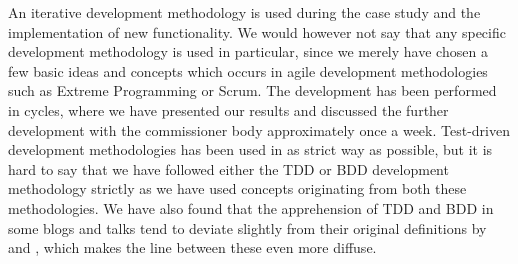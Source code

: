 
An iterative development methodology is used during the case study and
the implementation of new functionality. We would however not say that
any specific development methodology is used in particular, since we
merely have chosen a few basic ideas and concepts which occurs in agile
development methodologies such as Extreme Programming or Scrum. The
development has been performed in cycles, where we have presented our
results and discussed the further development with the commissioner body
approximately once a week. Test-driven development methodologies has
been used in as strict way as possible, but it is hard to say that we
have followed either the TDD or BDD development methodology strictly as
we have used concepts originating from both these methodologies. We have
also found that the apprehension of TDD and BDD in some blogs and talks
tend to deviate slightly from their original definitions by
\citeauthor{book:tdd_beck} and \citeauthor{web:dan_north}, which makes
the line between these even more diffuse.\\
